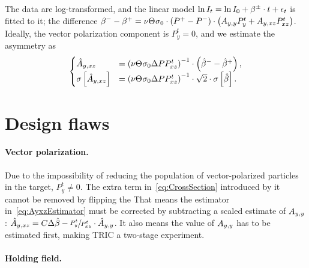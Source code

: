 \documentclass{article}
\begin{document}
The data are log-transformed, and the linear model $\ln I_t = \ln I_0 + \slp^\pm\cdot t + \err_t$ is fitted to it; the difference $\slp^- - \slp^+ = \nu\Thick\CS[0]\cdot\DP*\cdot\bkt{\Ayy P^t_y + \Ayxz P^t_{xz}}$. Ideally, the vector polarization component is $P^t_y = 0$, and we estimate the asymmetry as 
\begin{equation}\label{eq:AyxzEstimator}
\begin{cases}
	\Ayxz* 		&= \bkt{\nu\Thick\CS[0]\DP P^t_{xz}}^{-1}\cdot\bkt{\slp*^- - \slp*^+}, \\
	\SE{\Ayxz*} &= \bkt{\nu\Thick\CS[0]\DP P^t_{xz}}^{-1}\cdot\sqrt2\cdot\SE{\slp*}.
\end{cases}
\end{equation}
 
\section{Design flaws}
\paragraph{Vector polarization.}
Due to the impossibility of reducing the population of vector-polarized particles in the target, $P^t_y \neq 0$. The extra term in~\eqref{eq:CrossSection} introduced by it cannot be removed by flipping the  That means the estimator in~\eqref{eq:AyxzEstimator} must be corrected by subtracting a scaled estimate of $\Ayy$: $\Ayxz* = C\Delta\slp* - \sfrac{P^t_y}{P^t_{xz}}\cdot\Ayy*$. It also means the value of $\Ayy$ has to be estimated first, making TRIC a two-stage experiment.

\paragraph{Holding field.}
\end{document}
